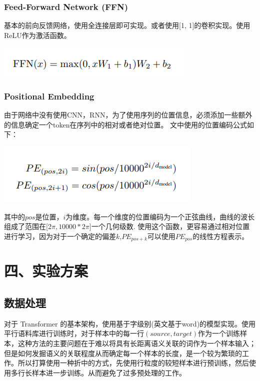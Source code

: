 \documentclass[UTF8,a4paper,10pt]{ctexart}
\begin{document}
\subsubsection{Feed-Forward Network  (FFN)}

基本的前向反馈网络，使用全连接层即可实现。或者使用[1, 1]的卷积实现。使用ReLU作为激活函数。

\centerline{\includegraphics[scale=0.6]{pics/190413-ffn.png}}


\subsubsection{Positional Embedding}

由于网络中没有使用CNN，RNN，为了使用序列的位置信息，必须添加一些额外的信息确定一个token在序列中的相对或者绝对位置。
文中使用的位置编码公式如下：

\centerline{\includegraphics[scale=0.6]{pics/190413-pos.png}}

其中的$pos$是位置，$i$为维度。每一个维度的位置编码为一个正弦曲线，曲线的波长组成了范围在[2$\pi,10000*2\pi$]一个几何级数.
使用这个函数，更容易通过相对位置进行学习，因为对于一个确定的偏差$k$,$PE_{pos+k}$可以使用$PE_{pos}$的线性方程表示。

\setcounter{section}{4}
\section*{四、实验方案}

\setcounter{subsection}{0}
\subsection{数据处理}
  对于 Transformer 的基本架构，使用基于字级别(英文基于word)的模型实现。使用平行语料库进行训练时，对于样本中的每一行$(source, target)$作为一个训练样本，这种方法的主要问题在于难以将具有长距离语义关联的词作为一个样本输入；但是如何发掘语义的关联程度从而确定每一个样本的长度，是一个较为繁琐的工作。所以打算使用一种折中的方式，先使用行粒度的较短样本进行预训练，然后使用多行长样本进一步训练。从而避免了过多预处理的工作。
\end{document}
